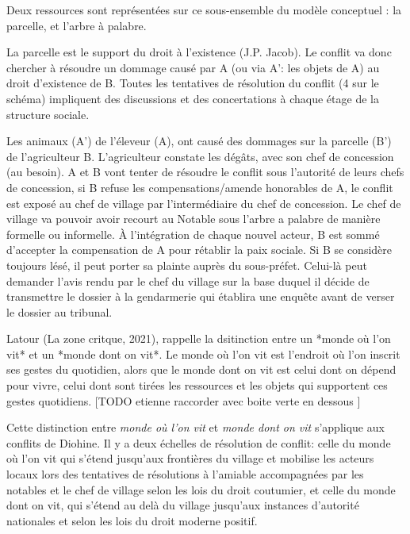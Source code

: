 Deux ressources sont représentées sur ce sous-ensemble du modèle conceptuel : la parcelle, et l'arbre à palabre.

La parcelle est le support du droit à l'existence (J.P. Jacob). Le conflit va donc chercher à résoudre un dommage causé par A (ou via A': les objets de A) au droit d'existence de B. Toutes les tentatives de résolution du conflit (4 sur le schéma) impliquent des discussions et des concertations à chaque étage de la structure sociale.

Les animaux (A') de l'éleveur (A), ont causé des dommages sur la parcelle (B') de l'agriculteur B. L'agriculteur constate les dégâts, avec son chef de concession (au besoin). A et B vont tenter de résoudre le conflit sous l'autorité de leurs chefs de concession, si B refuse les compensations/amende honorables de A, le conflit est exposé au chef de village par l'intermédiaire du chef de concession. Le chef de village va pouvoir avoir recourt au Notable sous l'arbre a palabre de manière formelle ou informelle. À l'intégration de chaque nouvel acteur, B est sommé d'accepter la compensation de A pour rétablir la paix sociale. Si B se considère toujours lésé, il peut porter sa plainte auprès du sous-préfet. Celui-là peut demander l'avis rendu par le chef du village sur la base duquel il décide de transmettre le dossier à la gendarmerie qui établira une enquête avant de verser le dossier au tribunal.

Latour (La zone critque, 2021), rappelle la dsitinction entre  un *monde où l'on vit* et un *monde dont on vit*. Le monde où l'on vit  est l'endroit où l'on inscrit ses gestes du quotidien, alors que le monde dont on vit est  celui dont on dépend pour vivre, celui dont sont tirées les ressources et les objets qui supportent ces gestes quotidiens. [TODO etienne raccorder avec boite verte en dessous ]


Cette distinction entre \textit{monde où l'on vit} et \textit{monde dont on vit} s'applique aux conflits de Diohine. Il y a deux échelles de résolution de conflit:  celle du monde où l'on vit qui s'étend jusqu'aux frontières du village et mobilise les acteurs locaux lors des tentatives de résolutions à l'amiable accompagnées par les notables et le chef de village selon les lois du droit coutumier,  et celle du monde dont on vit, qui s'étend au delà du village jusqu'aux instances d'autorité nationales et selon les lois du droit moderne positif.

